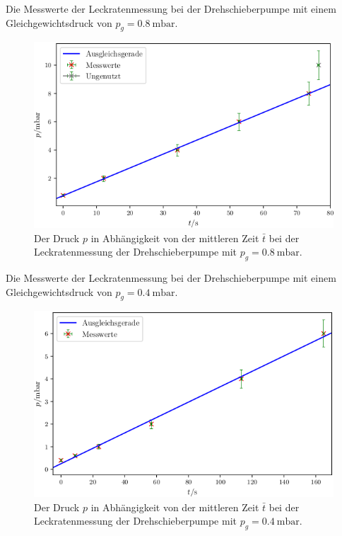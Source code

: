 \begin{table}
\centering
\caption{Die Messwerte der Leckratenmessung bei der Drehschieberpumpe mit einem Gleichgewichtsdruck von $p_g = \SI{0.8}{\milli\bar}$.}

\label{tab:DL2}
\end{table}

\begin{figure}
\centering
\includegraphics[width=\linewidth-70pt,height=\textheight-70pt,keepaspectratio]{content/images/DL2.png}
\caption{Der Druck $p$ in Abhängigkeit von der mittleren Zeit $\bar{t}$ bei der Leckratenmessung der Drehschieberpumpe  mit $p_g = \SI{0.8}{\milli\bar}$.}
\label{fig:DL2}
\end{figure}

\begin{table}
\centering
\caption{Die Messwerte der Leckratenmessung bei der Drehschieberpumpe mit einem Gleichgewichtsdruck von $p_g = \SI{0.4}{\milli\bar}$.}

\label{tab:DL3}
\end{table}

\begin{figure}
\centering
\includegraphics[width=\linewidth-70pt,height=\textheight-70pt,keepaspectratio]{content/images/DL3.png}
\caption{Der Druck $p$ in Abhängigkeit von der mittleren Zeit $\bar{t}$ bei der Leckratenmessung der Drehschieberpumpe  mit $p_g = \SI{0.4}{\milli\bar}$.}
\label{fig:DL3}
\end{figure}

